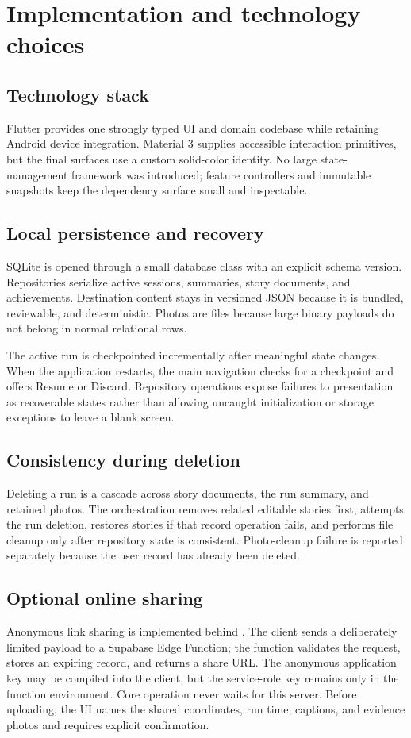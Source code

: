 \section{Implementation and technology choices}

\subsection{Technology stack}


Flutter provides one strongly typed UI and domain codebase while retaining
Android device integration. Material 3 supplies accessible interaction
primitives, but the final surfaces use a custom solid-color identity. No large
state-management framework was introduced; feature controllers and immutable
snapshots keep the dependency surface small and inspectable.

\subsection{Local persistence and recovery}
SQLite is opened through a small database class with an explicit schema version.
Repositories serialize active sessions, summaries, story documents, and
achievements. Destination content stays in versioned JSON because it is bundled,
reviewable, and deterministic. Photos are files because large binary payloads do
not belong in normal relational rows.

The active run is checkpointed incrementally after meaningful state changes.
When the application restarts, the main navigation checks for a checkpoint and
offers Resume or Discard. Repository operations expose failures to presentation
as recoverable states rather than allowing uncaught initialization or storage
exceptions to leave a blank screen.

\subsection{Consistency during deletion}
Deleting a run is a cascade across story documents, the run summary, and retained
photos. The orchestration removes related editable stories first, attempts the
run deletion, restores stories if that record operation fails, and performs file
cleanup only after repository state is consistent. Photo-cleanup failure is
reported separately because the user record has already been deleted.

\subsection{Optional online sharing}
Anonymous link sharing is implemented behind . The client
sends a deliberately limited payload to a Supabase Edge Function; the function
validates the request, stores an expiring record, and returns a share URL. The
anonymous application key may be compiled into the client, but the service-role
key remains only in the function environment. Core operation never waits for
this server. Before uploading, the UI names the shared coordinates, run time,
captions, and evidence photos and requires explicit confirmation.

